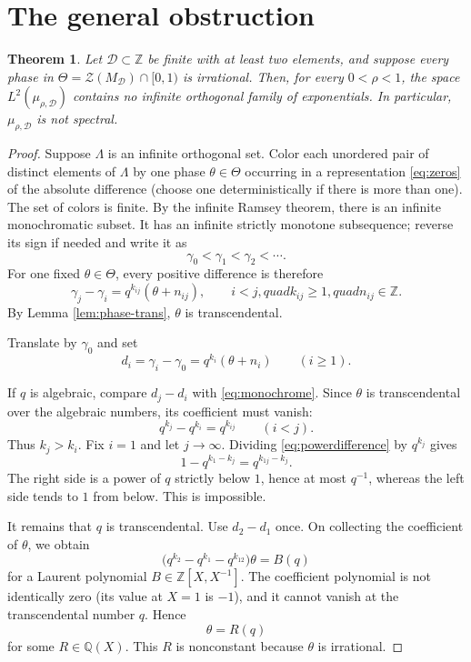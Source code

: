 \documentclass[11pt]{article}
\newtheorem{theorem}{Theorem}
\newcommand{\Z}{\mathbb Z}
\newcommand{\Q}{\mathbb Q}
\begin{document}
\section{The general obstruction}

\begin{theorem}\label{thm:general}
Let $\mathcal D\subset\Z$ be finite with at least two elements, and suppose
every phase in $\Theta=\mathcal Z(M_{\mathcal D})\cap[0,1)$ is irrational.
Then, for every $0<\rho<1$, the space
$L^2(\mu_{\rho,\mathcal D})$ contains no infinite orthogonal family of
exponentials.  In particular, $\mu_{\rho,\mathcal D}$ is not spectral.
\end{theorem}

\begin{proof}
Suppose $\Lambda$ is an infinite orthogonal set.  Color each unordered pair
of distinct elements of $\Lambda$ by one phase $\theta\in\Theta$ occurring
in a representation \eqref{eq:zeros} of the absolute difference (choose one
deterministically if there is more than one).  The set of colors is finite.
By the infinite Ramsey theorem, there is an infinite monochromatic subset.
It has an infinite strictly monotone subsequence; reverse its sign if needed
and write it as
\[
 \gamma_0<\gamma_1<\gamma_2<\cdots.
\]
For one fixed $\theta\in\Theta$, every positive difference is therefore
\begin{equation}\label{eq:monochrome}
 \gamma_j-\gamma_i=q^{k_{ij}}(\theta+n_{ij}),
 \qquad i<j,quad k_{ij}\geq1,quad n_{ij}\in\Z.
\end{equation}
By Lemma \ref{lem:phase-trans}, $\theta$ is transcendental.

Translate by $\gamma_0$ and set
\[
 d_i=\gamma_i-\gamma_0=q^{k_i}(\theta+n_i)\qquad(i\geq1).
\]

If $q$ is algebraic, compare $d_j-d_i$ with
\eqref{eq:monochrome}.  Since $\theta$ is transcendental over the algebraic
numbers, its coefficient must vanish:
\begin{equation}\label{eq:powerdifference}
 q^{k_j}-q^{k_i}=q^{k_{ij}}\qquad(i<j).
\end{equation}
Thus $k_j>k_i$.  Fix $i=1$ and let $j\to\infty$.  Dividing
\eqref{eq:powerdifference} by $q^{k_j}$ gives
\[
 1-q^{k_1-k_j}=q^{k_{1j}-k_j}.
\]
The right side is a power of $q$ strictly below $1$, hence at most $q^{-1}$,
whereas the left side tends to $1$ from below.  This is impossible.

It remains that $q$ is transcendental.  Use $d_2-d_1$ once.  On collecting
the coefficient of $\theta$, we obtain
\[
 \bigl(q^{k_2}-q^{k_1}-q^{k_{12}}\bigr)\theta=B(q)
\]
for a Laurent polynomial $B\in\Z[X,X^{-1}]$.  The coefficient polynomial is
not identically zero (its value at $X=1$ is $-1$), and it cannot vanish at
the transcendental number $q$.  Hence
\[
 \theta=R(q)
\]
for some $R\in\Q(X)$.  This $R$ is nonconstant because $\theta$ is
irrational.


\end{proof}
\end{document}
